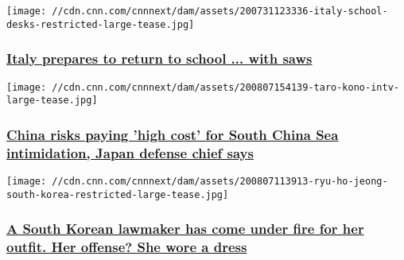 \href{/2020/08/07/europe/italy-school-return-sawing-up-desks-coronavirus-intl/index.html}{}

\texttt{[image: //cdn.cnn.com/cnnnext/dam/assets/200731123336-italy-school-desks-restricted-large-tease.jpg]}

\hypertarget{italy-prepares-to-return-to-school--with-saws-1}{%
\subsubsection{\texorpdfstring{\href{/2020/08/07/europe/italy-school-return-sawing-up-desks-coronavirus-intl/index.html}{Italy
prepares to return to school ... with
saws}}{Italy prepares to return to school ... with saws}}\label{italy-prepares-to-return-to-school--with-saws-1}}

\href{/2020/08/07/asia/japan-defense-minister-interview-south-china-sea-intl-hnk/index.html}{}

\texttt{[image: //cdn.cnn.com/cnnnext/dam/assets/200807154139-taro-kono-intv-large-tease.jpg]}

\hypertarget{china-risks-paying-high-cost-for-south-china-sea-intimidation-japan-defense-chief-says}{%
\subsubsection{\texorpdfstring{\href{/2020/08/07/asia/japan-defense-minister-interview-south-china-sea-intl-hnk/index.html}{China
risks paying 'high cost' for South China Sea intimidation, Japan defense
chief
says}}{China risks paying 'high cost' for South China Sea intimidation, Japan defense chief says}}\label{china-risks-paying-high-cost-for-south-china-sea-intimidation-japan-defense-chief-says}}

\href{/2020/08/07/asia/south-korea-politician-dress-intl-hnk/index.html}{}

\texttt{[image: //cdn.cnn.com/cnnnext/dam/assets/200807113913-ryu-ho-jeong-south-korea-restricted-large-tease.jpg]}

\hypertarget{a-south-korean-lawmaker-has-come-under-fire-for-her-outfit-her-offense-she-wore-a-dress}{%
\subsubsection{\texorpdfstring{\href{/2020/08/07/asia/south-korea-politician-dress-intl-hnk/index.html}{A
South Korean lawmaker has come under fire for her outfit. Her offense?
She wore a
dress}}{A South Korean lawmaker has come under fire for her outfit. Her offense? She wore a dress}}\label{a-south-korean-lawmaker-has-come-under-fire-for-her-outfit-her-offense-she-wore-a-dress}}

